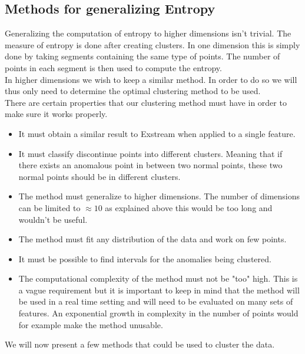 \documentclass[oneside, a4paper, onecolumn, 11pt]{article}
\begin{document}
\subsection{Methods for generalizing Entropy}
Generalizing the computation of entropy to higher dimensions isn't trivial. The measure of entropy is done after creating clusters. In one dimension this is simply done by taking segments containing the same type of points. The number of points in each segment is then used to compute the entropy.\\
In higher dimensions we wish to keep a similar method. In order to do so we will thus only need to determine the optimal clustering method to be used.\\
There are certain properties that our clustering method must have in order to make sure it works properly.
\begin{itemize}
  \item It must obtain a similar result to Exstream when applied to a single feature.
  \item It must classify discontinue points into different clusters. Meaning that if there exists an anomalous point in between two normal points, these two normal points should be in different clusters.
  \item The method must generalize to higher dimensions. The number of dimensions can be limited to $\approx10$ as explained above this would be too long and wouldn't be useful.
  \item The method must fit any distribution of the data and work on few points.
  \item It must be possible to find intervals for the anomalies being clustered.
  \item The computational complexity of the method must not be "too" high. This is a vague requirement but it is important to keep in mind that the method will be used in a real time setting and will need to be evaluated on many sets of features. An exponential growth in complexity in the number of points would for example make the method unusable.
\end{itemize}
We will now present a few methods that could be used to cluster the data.
\end{document}
